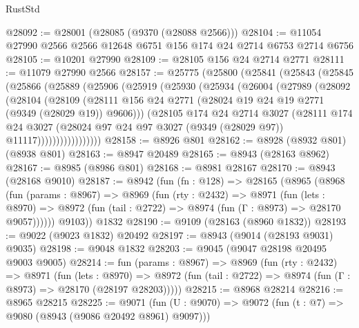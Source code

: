 \begin{lexlean}{RustStd}
\begin{coremodule}
@28092 := @28001 (@28085 (@9370 (@28088 @2566)))
@28104 := @11054 @27990 @2566 @2566 @12648 @6751 @156 @174 @24 @2714 @6753 @2714 @6756
@28105 := @10201 @27990
@28109 := @28105 @156 @24 @2714 @2771
@28111 := @11079 @27990 @2566
@28157 := @25775
    (@25800
      (@25841
        (@25843
          (@25845
            (@25866
              (@25889
                (@25906
                  (@25919
                    (@25930
                      (@25934
                        (@26004
                          (@27989
                            (@28092
                              (@28104
                                (@28109
                                  (@28111
                                    @156
                                    @24
                                    @2771
                                    (@28024 @19 @24 @19 @2771 (@9349 (@28029 @19)) @9606)))
                                (@28105
                                  @174
                                  @24
                                  @2714
                                  @3027
                                  (@28111
                                    @174
                                    @24
                                    @3027
                                    (@28024
                                      @97
                                      @24
                                      @97
                                      @3027
                                      (@9349 (@28029 @97))
                                      @11117)))))))))))))))))
@28158 := @8926 @801
@28162 := @8928 (@8932 @801) (@8938 @801)
@28163 := @8947 @20489
@28165 := @8943 (@28163 @8962)
@28167 := @8985 (@8986 @801)
@28168 := @8981 @28167
@28170 := @8943 (@28168 @9010)
@28187 := @8942
    (fun (fn : @128) =>
    @28165
      (@8965
        (@8968
          (fun (params : @8967) =>
          @8969
            (fun (rty : @2432) =>
            @8971
              (fun (lets : @8970) =>
              @8972 (fun (tail : @2722) => @8974 (fun (Γ : @8973) => @28170 @9057))))))
        @9103))
    @1832
@28190 := @9109 (@28163 (@8960 @1832))
@28193 := @9022 (@9023 @1832) @20492
@28197 := @8943 (@9014 (@28193 @9031) @9035)
@28198 := @9048 @1832
@28203 := @9045 (@9047 @28198 @20495 @9003 @9005)
@28214 := fun (params : @8967) =>
  @8969
    (fun (rty : @2432) =>
    @8971
      (fun (lets : @8970) =>
      @8972 (fun (tail : @2722) => @8974 (fun (Γ : @8973) => @28170 (@28197 @28203)))))
@28215 := @8968 @28214
@28216 := @8965 @28215
@28225 := @9071
    (fun (U : @9070) => @9072 (fun (t : @7) => @9080 (@8943 (@9086 @20492 @8961) @9097)))

\end{coremodule}
\end{lexlean}

